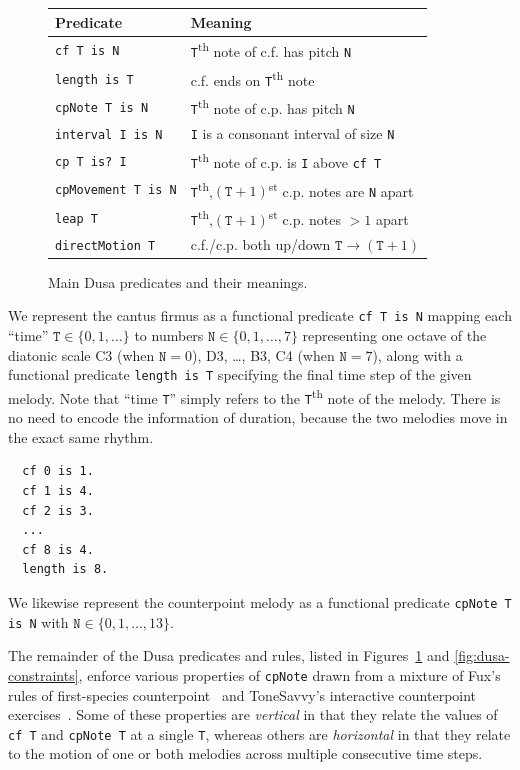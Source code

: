 \begin{figure}
\begin{tabular}{l|l}
\textbf{Predicate} & \textbf{Meaning} \\ \hline
\verb|cf T is N| & \verb|T|\textsuperscript{th} note of c.f. has pitch \verb|N| \\
\verb|length is T| & c.f. ends on \verb|T|\textsuperscript{th} note \\
\verb|cpNote T is N| & \verb|T|\textsuperscript{th} note of c.p. has pitch \verb|N| \\
\verb|interval I is N| & \verb|I| is a consonant interval of size \verb|N| \\
\verb|cp T is? I| & \verb|T|\textsuperscript{th} note of c.p. is \verb|I| above \verb|cf T| \\
\verb|cpMovement T is N| & \verb|T|\textsuperscript{th},$(\mathtt{T}+1)$\textsuperscript{st} c.p. notes are \verb|N| apart \\
\verb|leap T| & \verb|T|\textsuperscript{th},$(\mathtt{T}+1)$\textsuperscript{st} c.p. notes $>1$ apart \\
\verb|directMotion T| & c.f./c.p. both up/down $\mathtt{T}\to(\mathtt{T}+1)$
\end{tabular}
\caption{Main Dusa predicates and their meanings.}
\label{fig:dusa-predicates}
\end{figure}


We represent the cantus firmus as a functional predicate \verb|cf T is N| mapping each ``time'' $\mathtt{T}\in\{0,1,\dots\}$ to numbers $\mathtt{N}\in\{0,1,\dots,7\}$ representing one octave of the diatonic scale C3 (when $\mathtt{N}=0$), D3, \dots, B3, C4 (when $\mathtt{N}=7$), along with a functional predicate \verb|length is T| specifying the final time step of the given melody. Note that ``time \verb|T|'' simply refers to the \verb|T|\textsuperscript{th} note of the melody. There is no need to encode the information of duration, because the two melodies move in the exact same rhythm.

\begin{verbatim}
  cf 0 is 1.
  cf 1 is 4.
  cf 2 is 3.
  ...
  cf 8 is 4.
  length is 8.
\end{verbatim}

We likewise represent the counterpoint melody as a functional predicate \verb|cpNote T is N| with $\mathtt{N}\in\{0,1,\dots,13\}$.

The remainder of the Dusa predicates and rules, listed in Figures~\ref{fig:dusa-predicates} and \ref{fig:dusa-constraints}, enforce various properties of \verb|cpNote| drawn from a mixture of Fux's rules of first-species counterpoint~\cite{fux-cp} and ToneSavvy's interactive counterpoint exercises~\cite{tonesavvy}. Some of these properties are \emph{vertical} in that they relate the values of \verb|cf T| and \verb|cpNote T| at a single \verb|T|, whereas others are \emph{horizontal} in that they relate to the motion of one or both melodies across multiple consecutive time steps.



